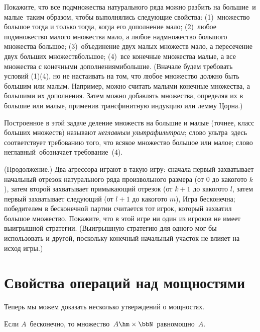 \begin{problem}
Покажите, что все подмножества натурального ряда можно разбить
на  большие\ и  малые\ таким образом, чтобы
выполнялись следующие свойства: (1)~множество большое тогда и
только тогда, когда его дополнение мало; (2)~любое подмножество
малого множества мало, а любое надмножество большого множества\т
большое; (3)~объединение двух малых множеств мало, а пересечение
двух больших множеств\т большое; (4)~все конечные множества\т
малые, а все множества с конечными дополнениями\т большие.
(Вначале будем требовать условий (1)\ч (4), но не настаивать на
том, что любое множество должно быть большим или малым.
Например, можно считать малыми конечные множества, а большими\т
их дополнения. Затем можно добавлять множества, определяя их в
большие или малые, применив трансфинитную индукцию или лемму
Цорна.)
\end{problem}

Построенное в этой задаче деление множеств на большие и малые
(точнее, класс больших множеств) называют \emph{неглавным
ультрафильтром}; слово  ультра\ здесь
соответствует требованию того, что всякое множество большое или
малое; слово  неглавный\ обозначает требование~(4).

\begin{problem}
(Продолжение.) Два агрессора играют в такую игру: сначала первый
захватывает начальный отрезок натурального ряда произвольного
размера (от $0$ до какого\д то $k$), затем второй захватывает
примыкающий отрезок (от $k+1$ до какого\д то $l$, затем первый
захватывает следующий (от $l+1$ до какого\д то $m$),  Игра
бесконечна; победителем в бесконечной партии считается тот
игрок, который захватил большое множество. Покажите, что в этой
игре ни один из игроков не имеет выигрышной стратегии.
(Выигрышную стратегию для одного мог бы использовать и другой,
поскольку конечный начальный участок не влияет на исход игры.)
\end{problem}


\section{Свойства операций над
мощностями}\label{cardinal-operations-revisited}

Теперь мы можем доказать несколько утверждений о мощностях.

\begin{theorem}
Если $A$~бесконечно, то множество~$A\hm\times\bbN$~равномощно~$A$.
\end{theorem}


